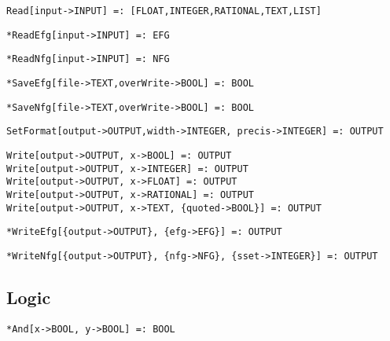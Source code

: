 \protect \large \begin{verbatim}
Read[input->INPUT] =: [FLOAT,INTEGER,RATIONAL,TEXT,LIST]
\end{verbatim}\normalsize

\protect \large \begin{verbatim}
*ReadEfg[input->INPUT] =: EFG
\end{verbatim}\normalsize

\protect \large \begin{verbatim}
*ReadNfg[input->INPUT] =: NFG
\end{verbatim}\normalsize

\protect \large \begin{verbatim}
*SaveEfg[file->TEXT,overWrite->BOOL] =: BOOL
\end{verbatim}\normalsize

\protect \large \begin{verbatim}
*SaveNfg[file->TEXT,overWrite->BOOL] =: BOOL
\end{verbatim}\normalsize

\protect \large \begin{verbatim}
SetFormat[output->OUTPUT,width->INTEGER, precis->INTEGER] =: OUTPUT
\end{verbatim}\normalsize


\protect \large \begin{verbatim}
Write[output->OUTPUT, x->BOOL] =: OUTPUT 
Write[output->OUTPUT, x->INTEGER] =: OUTPUT
Write[output->OUTPUT, x->FLOAT] =: OUTPUT
Write[output->OUTPUT, x->RATIONAL] =: OUTPUT
Write[output->OUTPUT, x->TEXT, {quoted->BOOL}] =: OUTPUT
\end{verbatim}\normalsize


\protect \large \begin{verbatim}
*WriteEfg[{output->OUTPUT}, {efg->EFG}] =: OUTPUT
\end{verbatim}\normalsize


\protect \large \begin{verbatim}
*WriteNfg[{output->OUTPUT}, {nfg->NFG}, {sset->INTEGER}] =: OUTPUT
\end{verbatim}\normalsize



\medskip
\subsection{Logic}

\protect \large \begin{verbatim}
*And[x->BOOL, y->BOOL] =: BOOL
\end{verbatim} \normalsize



